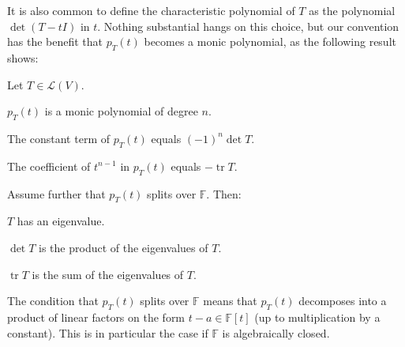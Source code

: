 \documentclass[a4paper, 11pt]{memoir}
\numberwithin{equation}{chapter}
\newcommand{\calL}{\mathcal{L}}
\DeclareMathOperator{\trace}{tr}
\newcommand{\field}{\mathbb{F}}
\begin{document}
It is also common to define the characteristic polynomial of $T$ as the polynomial $\det(T - tI)$ in $t$. Nothing substantial hangs on this choice, but our convention has the benefit that $p_T(t)$ becomes a monic polynomial, as the following result shows:

\begin{proposition}
    \label{prop:determinant-eigenvalues}
    Let $T \in \calL(V)$.
    \begin{enumprop}
        \item \label{enum:characteristic-polynomial-monic} $p_T(t)$ is a monic polynomial of degree $n$.
        \item \label{enum:characteristic-polynomial-constant-term} The constant term of $p_T(t)$ equals $(-1)^n \det T$.
        \item \label{enum:characteristic-polynomial-coefficient} The coefficient of $t^{n-1}$ in $p_T(t)$ equals $-\trace T$.
    \end{enumprop}
    Assume further that $p_T(t)$ splits over $\field$. Then:
    \begin{enumprop}[resume]
        \item \label{enum:eigenvalue-existence} $T$ has an eigenvalue.
        \item \label{enum:eigenvalue-product} $\det T$ is the product of the eigenvalues of $T$.
        \item \label{enum:eigenvalue-sum} $\trace T$ is the sum of the eigenvalues of $T$.
    \end{enumprop}
\end{proposition}
%
The condition that $p_T(t)$ splits over $\field$ means that $p_T(t)$ decomposes into a product of linear factors on the form $t - a \in \field[t]$ (up to multiplication by a constant). This is in particular the case if $\field$ is algebraically closed.
\end{document}
